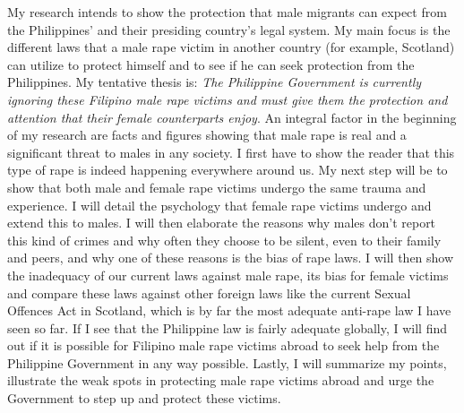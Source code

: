 My research intends to show the protection that male migrants can expect from the Philippines' and their presiding country's legal system. My main focus is the different laws that a male rape victim in another country (for example, Scotland) can utilize to protect himself and to see if he can seek protection from the Philippines. My tentative thesis is:\textit{ The Philippine Government is currently ignoring these Filipino male rape victims and must give them the protection and attention that their female counterparts enjoy}. An integral factor in the beginning of my research are facts and figures showing that male rape is real and a significant threat to males in any society. I first have to show the reader that this type of rape is indeed happening everywhere around us. My next step will be to show that both male and female rape victims undergo the same trauma and experience. I will detail the psychology that female rape victims   undergo and extend this to males. I will then elaborate the reasons why males don't report this kind of crimes and why often they choose to be silent, even to their family and peers, and why one of these reasons is the bias of rape laws. I will then show the inadequacy of our current laws against male rape, its bias for female victims and compare these laws against other foreign laws like the current Sexual Offences Act in Scotland, which is by far the most adequate anti-rape law I have seen so far. If I see that the Philippine law is fairly adequate globally, I will find out if it is possible for Filipino male rape victims abroad to seek help from the Philippine Government in any way possible. Lastly, I will summarize my points, illustrate the weak spots in protecting male rape victims abroad and urge the Government to step up and protect these victims.

